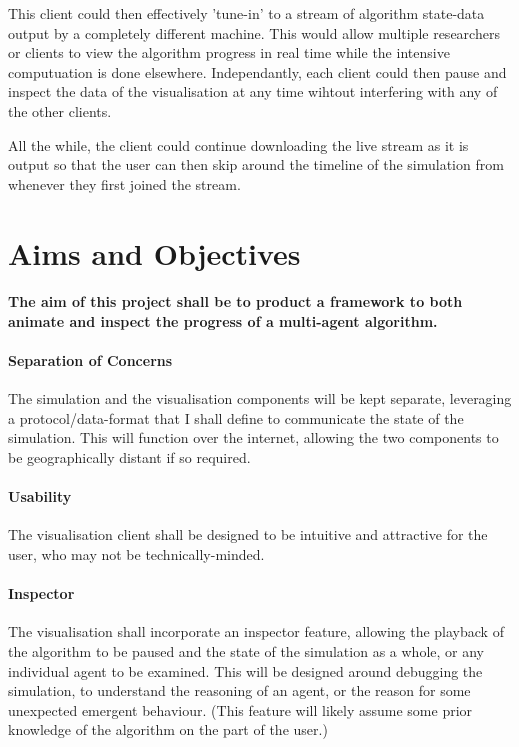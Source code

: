 \documentclass[a4paper]{article}
\begin{document}
		This client could then effectively 'tune-in' to a stream of algorithm state-data output by a completely different machine. This would allow multiple researchers or clients to view the algorithm progress in real time while the intensive computuation is done elsewhere. Independantly, each client could then pause and inspect the data of the visualisation at any time wihtout interfering with any of the other clients.

		All the while, the client could continue downloading the live stream as it is output so that the user can then skip around the timeline of the simulation from whenever they first joined the stream.

	\section{Aims and Objectives}

		\paragraph{The aim of this project shall be to product a framework to both animate and inspect the progress of a multi-agent algorithm.}

		\paragraph{Separation of Concerns} The simulation and the visualisation components will be kept separate, leveraging a protocol/data-format that I shall define to communicate the state of the simulation. This will function over the internet, allowing the two components to be geographically distant if so required.

		\paragraph{Usability} The visualisation client shall be designed to be intuitive and attractive for the user, who may not be technically-minded.

		\paragraph{Inspector} The visualisation shall incorporate an inspector feature, allowing the playback of the algorithm to be paused and the state of the simulation as a whole, or any individual agent to be examined. This will be designed around debugging the simulation, to understand the reasoning of an agent, or the reason for some unexpected emergent behaviour. (This feature will likely assume some prior knowledge of the algorithm on the part of the user.)
\end{document}
